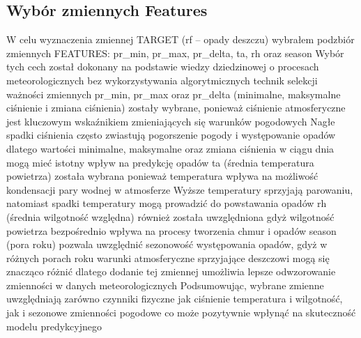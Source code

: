 \documentclass[10pt,a4paper]{article}
\begin{document}
\subsection*{Wybór zmiennych Features}
\noindent W celu wyznaczenia zmiennej TARGET (rf – opady deszczu) wybrałem podzbiór zmiennych FEATURES: pr\_min, pr\_max, pr\_delta, ta, rh oraz season Wybór tych cech został dokonany na podstawie wiedzy dziedzinowej o procesach meteorologicznych bez wykorzystywania algorytmicznych technik selekcji ważności zmiennych pr\_min, pr\_max oraz pr\_delta (minimalne, maksymalne ciśnienie i zmiana ciśnienia) zostały wybrane, ponieważ ciśnienie atmosferyczne jest kluczowym wskaźnikiem zmieniających się warunków pogodowych Nagłe spadki ciśnienia często zwiastują pogorszenie pogody i występowanie opadów dlatego wartości minimalne, maksymalne oraz zmiana ciśnienia w ciągu dnia mogą mieć istotny wpływ na predykcję opadów ta (średnia temperatura powietrza) została wybrana ponieważ temperatura wpływa na możliwość kondensacji pary wodnej w atmosferze Wyższe temperatury sprzyjają parowaniu, natomiast spadki temperatury mogą prowadzić do powstawania opadów rh (średnia wilgotność względna) również została uwzględniona gdyż wilgotność powietrza bezpośrednio wpływa na procesy tworzenia chmur i opadów season (pora roku) pozwala uwzględnić sezonowość występowania opadów, gdyż w różnych porach roku warunki atmosferyczne sprzyjające deszczowi mogą się znacząco różnić dlatego dodanie tej zmiennej umożliwia lepsze odwzorowanie zmienności w danych meteorologicznych Podsumowując, wybrane zmienne uwzględniają zarówno czynniki fizyczne jak ciśnienie temperatura i wilgotność, jak i sezonowe zmienności pogodowe co może pozytywnie wpłynąć na skuteczność modelu predykcyjnego
\end{document}
